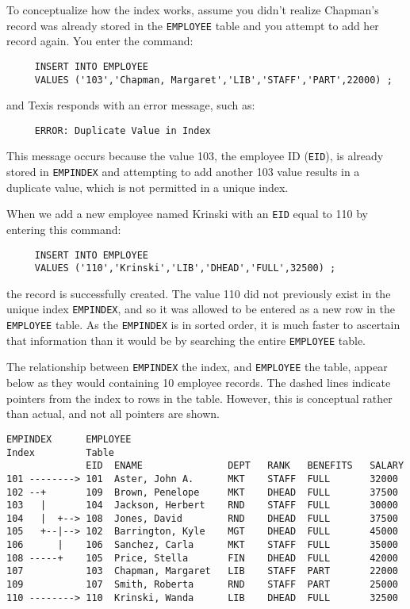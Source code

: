 To conceptualize how the index works, assume you didn't realize
Chapman's record was already stored in the \verb`EMPLOYEE` table and you
attempt to add her record again.  You enter the command:

\begin{verbatim}
     INSERT INTO EMPLOYEE
     VALUES ('103','Chapman, Margaret','LIB','STAFF','PART',22000) ;
\end{verbatim}

and Texis responds with an error message, such as:

\begin{verbatim}
     ERROR: Duplicate Value in Index
\end{verbatim}

This message occurs because the value 103, the employee ID (\verb`EID`), is
already stored in \verb`EMPINDEX` and attempting to add another 103 value
results in a duplicate value, which is not permitted in a unique
index.

When we add a new employee named Krinski with an \verb`EID` equal to 110 by
entering this command:

\begin{verbatim}
     INSERT INTO EMPLOYEE
     VALUES ('110','Krinski','LIB','DHEAD','FULL',32500) ;
\end{verbatim}

the record is successfully created.  The value 110 did not previously
exist in the unique index \verb`EMPINDEX`, and so it was allowed to be
entered as a new row in the \verb`EMPLOYEE` table.  As the
\verb`EMPINDEX` is in sorted order, it is much faster to ascertain
that information than it would be by searching the entire
\verb`EMPLOYEE` table.

The relationship between \verb`EMPINDEX` the index, and
\verb`EMPLOYEE` the table, appear below as they would containing 10
employee records.  The dashed lines indicate pointers from the index
to rows in the table.  However, this is conceptual rather than actual,
and not all pointers are shown.

\begin{screen}
\begin{verbatim}
EMPINDEX      EMPLOYEE
Index         Table
              EID  ENAME               DEPT   RANK   BENEFITS   SALARY
101 --------> 101  Aster, John A.      MKT    STAFF  FULL       32000
102 --+       109  Brown, Penelope     MKT    DHEAD  FULL       37500
103   |       104  Jackson, Herbert    RND    STAFF  FULL       30000
104   |  +--> 108  Jones, David        RND    DHEAD  FULL       37500
105   +--|--> 102  Barrington, Kyle    MGT    DHEAD  FULL       45000
106      |    106  Sanchez, Carla      MKT    STAFF  FULL       35000
108 -----+    105  Price, Stella       FIN    DHEAD  FULL       42000
107           103  Chapman, Margaret   LIB    STAFF  PART       22000
109           107  Smith, Roberta      RND    STAFF  PART       25000
110 --------> 110  Krinski, Wanda      LIB    DHEAD  FULL       32500
\end{verbatim}
\end{screen}

